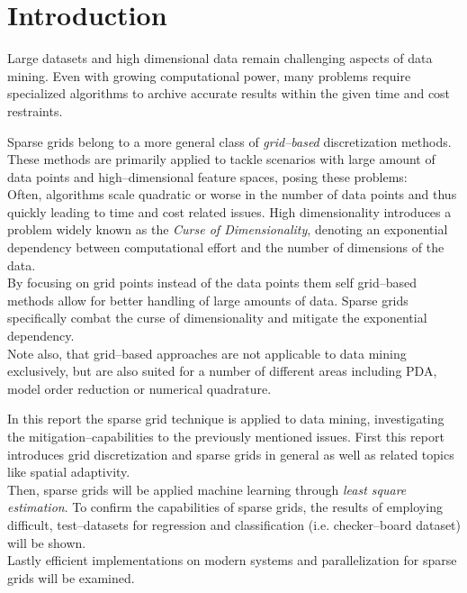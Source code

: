 \section{Introduction}
Large datasets and high dimensional data remain challenging aspects of data
mining. Even with growing computational power, many problems require
specialized algorithms to archive accurate results within the given time and
cost restraints.

\par

Sparse grids belong to a more general class of \emph{grid--based}
discretization methods. These methods are primarily applied to
tackle scenarios with large amount of data points and high--dimensional
feature spaces, posing these problems:
\\
Often, algorithms scale quadratic or worse in the number of data points and
thus quickly leading to time and cost related issues.
High dimensionality introduces a problem widely known as the \emph{Curse of
Dimensionality}, denoting an exponential dependency between computational
effort and the number of dimensions of the data. \\
By focusing on grid points instead
of the data points them self grid--based methods allow for better handling of large amounts of data. 
Sparse grids specifically combat the curse of dimensionality and mitigate
the exponential dependency. \\
Note also, that grid--based approaches are not applicable to data mining
exclusively, but are also
suited for a number of different areas including PDA, model order
reduction or numerical quadrature.

\par

In this report the sparse grid technique is applied to data mining,
investigating the mitigation--capabilities to the previously mentioned issues.
First this report introduces grid discretization and sparse grids in
general as well as related topics like spatial adaptivity. \\
Then, sparse grids will be applied machine learning
through \emph{least square estimation}. To confirm the capabilities
of sparse grids, the results of employing difficult,
test--datasets for regression and classification (i.e.
checker--board dataset) will be shown. \\
Lastly  efficient implementations on modern systems and parallelization for
sparse grids will be examined.

